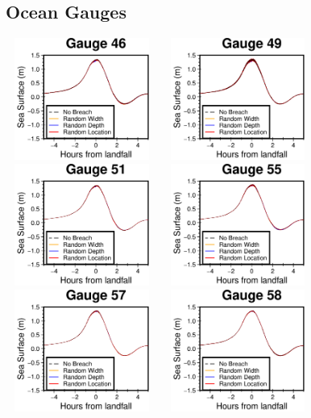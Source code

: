 \subsection{Ocean Gauges}
\includegraphics[width=5cm, height=4cm]{images/gauges/ocean_46.png}
\includegraphics[width=5cm, height=4cm]{images/gauges/ocean_49.png}
\includegraphics[width=5cm, height=4cm]{images/gauges/ocean_51.png}
\includegraphics[width=5cm, height=4cm]{images/gauges/ocean_55.png}
\includegraphics[width=5cm, height=4cm]{images/gauges/ocean_57.png}
\includegraphics[width=5cm, height=4cm]{images/gauges/ocean_58.png}




